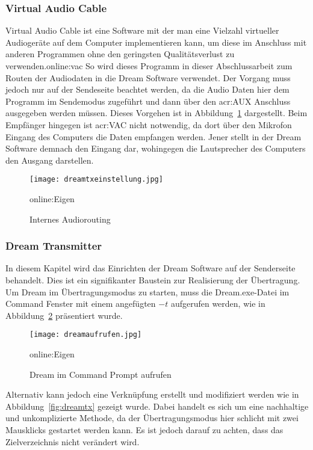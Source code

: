 \subsubsection{Virtual Audio Cable}
\label{subsubsec:routing}
Virtual Audio Cable ist eine Software mit der man eine Vielzahl virtueller Audiogeräte auf dem Computer implementieren kann, um diese im Anschluss mit anderen Programmen ohne den geringsten Qualitätsverlust zu verwenden.\gls{online:vac} So wird dieses Programm in dieser Abschlussarbeit zum Routen der Audiodaten in die Dream Software verwendet. Der Vorgang muss jedoch nur auf der Sendeseite beachtet werden, da die Audio Daten hier dem Programm im Sendemodus zugeführt und dann über den \gls{acr:AUX} Anschluss ausgegeben werden müssen. Dieses Vorgehen ist in Abbildung~\ref{fig:dreamtxeinstellung} dargestellt. Beim Empfänger hingegen ist \gls{acr:VAC} nicht notwendig, da dort über den Mikrofon Eingang des Computers die Daten empfangen werden. Jener stellt in der Dream Software demnach den Eingang dar, wohingegen die Lautsprecher des Computers den Ausgang darstellen.

\begin{figure}[H]
	\centering
	\texttt{[image: dreamtxeinstellung.jpg]}
	\caption[Internes Audiorouting]{Internes Audiorouting} \gls{online:Eigen}
	\label{fig:dreamtxeinstellung}
\end{figure}


\subsubsection{Dream Transmitter}
\label{subsubsec:dreamtx}
In diesem Kapitel wird das Einrichten der Dream Software auf der Senderseite behandelt. Dies ist ein signifikanter Baustein zur Realisierung der Übertragung. Um Dream im Übertragungsmodus zu starten, muss die Dream.exe-Datei im Command Fenster mit einem angefügten $-t$ aufgerufen werden, wie in Abbildung~\ref{fig:dreamaufrufen} präsentiert wurde.

\begin{figure}[H]
	\centering
	\texttt{[image: dreamaufrufen.jpg]}
	\caption[Dream im Command Prompt aufrufen]{Dream im Command Prompt aufrufen} \gls{online:Eigen}
	\label{fig:dreamaufrufen}
\end{figure}

Alternativ kann jedoch eine Verknüpfung erstellt und modifiziert werden wie in Abbildung~\ref{fig:dreamtx} gezeigt wurde. Dabei handelt es sich um eine nachhaltige und unkomplizierte Methode, da der Übertragungsmodus hier schlicht mit zwei Mausklicks gestartet werden kann. Es ist jedoch darauf zu achten, dass das Zielverzeichnis nicht verändert wird. 

